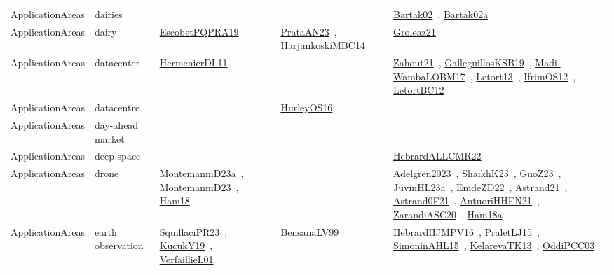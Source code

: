 {\begin{longtable}{lp{3cm}>{\raggedright\arraybackslash}p{6cm}>{\raggedright\arraybackslash}p{6cm}>{\raggedright\arraybackslash}p{8cm}}
ApplicationAreas & dairies &  &  & \href{../works/Bartak02.pdf}{Bartak02}~\cite{Bartak02}, \href{../works/Bartak02a.pdf}{Bartak02a}~\cite{Bartak02a}\\
ApplicationAreas & dairy & \href{../works/EscobetPQPRA19.pdf}{EscobetPQPRA19}~\cite{EscobetPQPRA19} & \href{../works/PrataAN23.pdf}{PrataAN23}~\cite{PrataAN23}, \href{../works/HarjunkoskiMBC14.pdf}{HarjunkoskiMBC14}~\cite{HarjunkoskiMBC14} & \href{../works/Groleaz21.pdf}{Groleaz21}~\cite{Groleaz21}\\
ApplicationAreas & datacenter & \href{../works/HermenierDL11.pdf}{HermenierDL11}~\cite{HermenierDL11} &  & \href{../works/Zahout21.pdf}{Zahout21}~\cite{Zahout21}, \href{../works/GalleguillosKSB19.pdf}{GalleguillosKSB19}~\cite{GalleguillosKSB19}, \href{../works/Madi-WambaLOBM17.pdf}{Madi-WambaLOBM17}~\cite{Madi-WambaLOBM17}, \href{../works/Letort13.pdf}{Letort13}~\cite{Letort13}, \href{../works/IfrimOS12.pdf}{IfrimOS12}~\cite{IfrimOS12}, \href{../works/LetortBC12.pdf}{LetortBC12}~\cite{LetortBC12}\\
ApplicationAreas & datacentre &  & \href{../works/HurleyOS16.pdf}{HurleyOS16}~\cite{HurleyOS16} & \\
ApplicationAreas & day-ahead market &  &  & \\
ApplicationAreas & deep space &  &  & \href{../works/HebrardALLCMR22.pdf}{HebrardALLCMR22}~\cite{HebrardALLCMR22}\\
ApplicationAreas & drone & \href{../works/MontemanniD23a.pdf}{MontemanniD23a}~\cite{MontemanniD23a}, \href{../works/MontemanniD23.pdf}{MontemanniD23}~\cite{MontemanniD23}, \href{../works/Ham18.pdf}{Ham18}~\cite{Ham18} &  & \href{../works/Adelgren2023.pdf}{Adelgren2023}~\cite{Adelgren2023}, \href{../works/ShaikhK23.pdf}{ShaikhK23}~\cite{ShaikhK23}, \href{../works/GuoZ23.pdf}{GuoZ23}~\cite{GuoZ23}, \href{../works/JuvinHL23a.pdf}{JuvinHL23a}~\cite{JuvinHL23a}, \href{../works/EmdeZD22.pdf}{EmdeZD22}~\cite{EmdeZD22}, \href{../works/Astrand21.pdf}{Astrand21}~\cite{Astrand21}, \href{../works/Astrand0F21.pdf}{Astrand0F21}~\cite{Astrand0F21}, \href{../works/AntuoriHHEN21.pdf}{AntuoriHHEN21}~\cite{AntuoriHHEN21}, \href{../works/ZarandiASC20.pdf}{ZarandiASC20}~\cite{ZarandiASC20}, \href{../works/Ham18a.pdf}{Ham18a}~\cite{Ham18a}\\
ApplicationAreas & earth observation & \href{../works/SquillaciPR23.pdf}{SquillaciPR23}~\cite{SquillaciPR23}, \href{../works/KucukY19.pdf}{KucukY19}~\cite{KucukY19}, \href{../works/VerfaillieL01.pdf}{VerfaillieL01}~\cite{VerfaillieL01} & \href{../works/BensanaLV99.pdf}{BensanaLV99}~\cite{BensanaLV99} & \href{../works/HebrardHJMPV16.pdf}{HebrardHJMPV16}~\cite{HebrardHJMPV16}, \href{../works/PraletLJ15.pdf}{PraletLJ15}~\cite{PraletLJ15}, \href{../works/SimoninAHL15.pdf}{SimoninAHL15}~\cite{SimoninAHL15}, \href{../works/KelarevaTK13.pdf}{KelarevaTK13}~\cite{KelarevaTK13}, \href{../works/OddiPCC03.pdf}{OddiPCC03}~\cite{OddiPCC03}\\

\end{longtable}}
